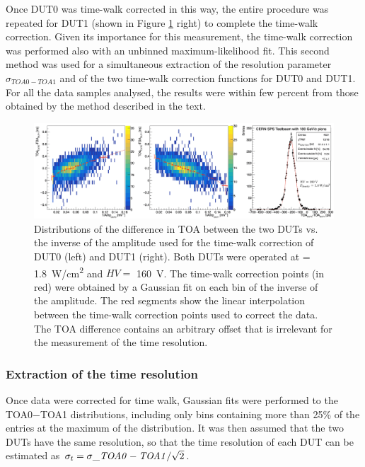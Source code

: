 		Once DUT0 was time-walk corrected in this way, the entire procedure was repeated for DUT1 (shown in Figure \ref{im:ATTRACT_TWcorr} right) to complete the time-walk correction. Given its importance for this measurement, the time-walk correction was performed also with an unbinned maximum-likelihood fit. This second method was used for a simultaneous extraction of the resolution parameter $\sigma_{TOA0-TOA1}$ and of the two time-walk correction functions for DUT0 and DUT1. For all the data samples analysed, the results were within few percent from those obtained by the method described in the text.
		\begin{figure}[h]
			\centering %
			\includegraphics[width=0.92\linewidth]{files/ATTRACT_paper/TimeRes_WP7_160V}
			\caption{Distributions of the difference in TOA between the two DUTs vs. the inverse of the amplitude used for the time-walk correction of DUT0 (left) and DUT1 (right). Both DUTs were operated at \power = \SI{1.8}{\watt/\centi\meter^2} and $ HV =$ \SI{160}{\volt}. The time-walk correction points (in red) were obtained by a Gaussian fit on each bin of the inverse of the amplitude. The red segments show the linear interpolation between the time-walk correction points used to correct the data. The TOA difference contains an arbitrary offset that is irrelevant for the measurement of the time resolution.}
			\label{im:ATTRACT_TWcorr}
		\end{figure}

		\subsubsection{Extraction of the time resolution}
		Once data were corrected for time walk, Gaussian fits were performed to the TOA0$-$TOA1 distributions, including only bins containing more than 25\% of the entries at the maximum of the distribution. It was then assumed that the two DUTs have the same resolution, so that the time resolution of each DUT can be estimated as $\sigma_{t} = \sigma\_{\it TOA0-TOA1}/\sqrt{2}$.

